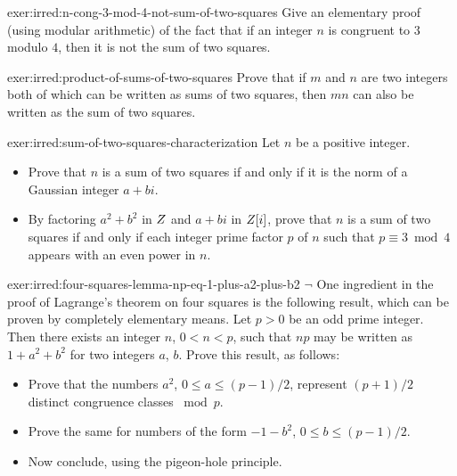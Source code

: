 \begin{exer}{}{exer:irred:n-cong-3-mod-4-not-sum-of-two-squares}
  Give an elementary proof (using modular arithmetic) of the fact that
  if an integer $n$ is congruent to $3$ modulo $4$, then it is not the
  sum of two squares.
\end{exer}
\begin{exer}{}{exer:irred:product-of-sums-of-two-squares}
  Prove that if $m$ and $n$ are two integers both of which can be
  written as sums of two squares, then $mn$ can also be written as the
  sum of two squares.
\end{exer}
\begin{exer}{}{exer:irred:sum-of-two-squares-characterization}
  Let $n$ be a positive integer.
  \begin{itemize}
  \item Prove that $n$ is a sum of two squares if and only if it is
    the norm of a Gaussian integer $a + bi$.
  \item By factoring $a^2 + b^2$ in $Z$ and $a + bi$ in $Z[i]$,
    prove that $n$ is a sum of two squares if and only if each integer
    prime factor $p$ of $n$ such that $p \equiv 3 \bmod 4$ appears
    with an even power in $n$.
  \end{itemize}
\end{exer}
\begin{exer}{}{exer:irred:four-squares-lemma-np-eq-1-plus-a2-plus-b2}
  $\lnot$ One ingredient in the proof of Lagrange's theorem on four
  squares is the following result, which can be proven by completely
  elementary means.  Let $p > 0$ be an odd prime integer. Then there
  exists an integer $n$, $0 < n < p$, such that $np$ may be written as
  $1 + a^2 + b^2$ for two integers $a$, $b$. Prove this result, as
  follows:
  \begin{itemize}
  \item Prove that the numbers $a^2$, $0 \leq a \leq (p-1)/2$,
    represent $(p+1)/2$ distinct congruence classes $\bmod p$.
  \item Prove the same for numbers of the form $-1 - b^2$,
    $0 \leq b \leq (p-1)/2$.
  \item Now conclude, using the pigeon-hole principle.
  \end{itemize}
\end{exer}
